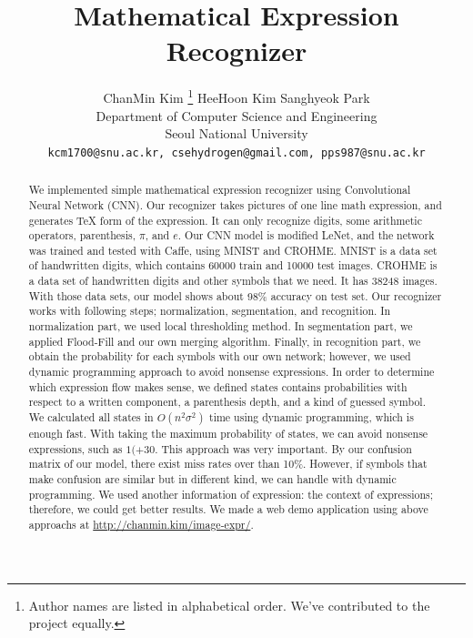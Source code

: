 \documentclass[10pt,twocolumn,letterpaper]{article}
\begin{document}
\title{Mathematical Expression Recognizer}

\author{ChanMin Kim
\thanks{
    Author names are listed in alphabetical order. We've contributed to the project equally.
}
\qquad HeeHoon Kim \qquad Sanghyeok Park\\
Department of Computer Science and Engineering\\
Seoul National University\\
{\tt\small kcm1700@snu.ac.kr, csehydrogen@gmail.com, pps987@snu.ac.kr}
}

\maketitle

\begin{abstract}
    We implemented simple mathematical expression recognizer using Convolutional Neural Network (CNN).
    Our recognizer takes pictures of one line math expression, and generates TeX form of the expression.
    It can only recognize digits, some arithmetic operators, parenthesis, $\pi$, and $e$.
    Our CNN model is modified LeNet, and the network was trained and tested with Caffe, using MNIST and CROHME.
    MNIST is a data set of handwritten digits, which contains 60000 train and 10000 test images.
    CROHME is a data set of handwritten digits and other symbols that we need. It has 38248 images.
    With those data sets, our model shows about 98\% accuracy on test set.
    Our recognizer works with following steps; normalization, segmentation, and recognition.
    In normalization part, we used local thresholding method.
    In segmentation part, we applied Flood-Fill and our own merging algorithm.
    Finally, in recognition part, we obtain the probability for each symbols with our own network;
    however, we used dynamic programming approach to avoid nonsense expressions.
    In order to determine which expression flow makes sense,
    we defined states contains probabilities with respect to a written component, a parenthesis depth, and a kind of guessed symbol. %
    We calculated all states in $O(n^2 \sigma^2)$ time using dynamic programming, which is enough fast.
    With taking the maximum probability of states, we can avoid nonsense expressions, such as $1(+30$.
    This approach was very important.
    By our confusion matrix of our model, there exist miss rates over than 10\%.
    However, if symbols that make confusion are similar but in different kind, we can handle with dynamic programming.
    We used another information of expression: the context of expressions; therefore, we could get better results.
    We made a web demo application using above approachs at \url{http://chanmin.kim/image-expr/}.
\end{abstract}
\end{document}
